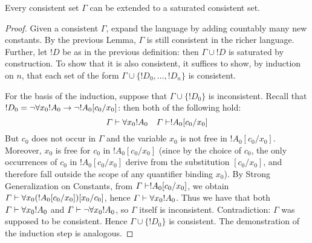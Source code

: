 \documentclass[open-logic-section]{subfiles}
\begin{document}
\begin{thm}
  Every consistent set $\Gamma$ can be extended to a saturated
  consistent set.
\end{thm}

\begin{proof}
Given a consistent $\Gamma$, expand the language by adding countably
many new constants. By the previous Lemma, $\Gamma$ is still
consistent in the richer language. Further, let $!D$ be as in the
previous definition: then $\Gamma \cup !D$ is saturated by
construction. To show that it is also consistent, it suffices to show,
by induction on $n$, that each set of the form $\Gamma \cup \{
!D_0, \dots, !D_n \}$ is consistent.

For the basis of the induction, suppose that $\Gamma \cup \{ !D_0
\}$ is inconsistent. Recall that $!D_0 = \lnot \lforall[x_0] !A_0
\lif \lnot !A_0 [c_0/x_0]$: then both of the following hold:
\[
\Gamma \Proves \lforall[x_0] !A_0
\quad
\Gamma \Proves !A_0[c_0/x_0]
\]
But $c_0$ does not occur in $\Gamma$ and the variable $x_0$ is not
free in $!A_0 [ c_0/x_0]$. Moreover, $x_0$ is free for $c_0$ in $!A_0
[c_0/x_0]$ (since by the choice of $c_0$, the only occurrences of
$c_0$ in $!A_0 [c_0/x_0]$ derive from the substitution $[c_0/x_0]$,
and therefore fall outside the scope of any quantifier binding
$x_0$). By Strong Generalization on Constants, from $\Gamma \Proves
!A_0 [c_0/x_0]$, we obtain $\Gamma \Proves \lforall[x_0] ( !A_0
[c_0/x_0] ) [x_0/c_0]$, hence $\Gamma \Proves \lforall[x_0]
!A_0$. Thus we have that both $\Gamma \Proves \lforall[x_0] !A_0$ and
$\Gamma \Proves \lnot \lforall[x_0] !A_0$, so $\Gamma$ itself is
inconsistent. Contradiction: $\Gamma$ was supposed to be
consistent. Hence $\Gamma \cup \{ !D_0\}$ is consistent. The
demonstration of the induction step is analogous.
\end{proof}
\end{document}
